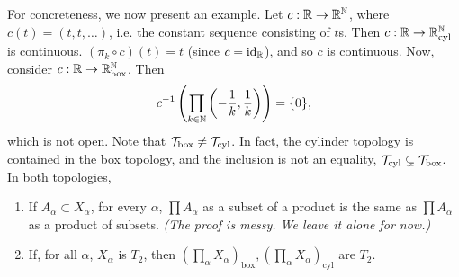 For concreteness, we now present an example. Let $c : \mathbb R \to \mathbb R^\mathbb N$, where $c(t) = (t, t, \dots)$, i.e. the constant sequence consisting of $t$s. Then $c : \mathbb R \to \mathbb R^\mathbb N_\mathrm{cyl}$ is continuous. $(\pi_k \circ c)(t) = t$ (since $c = \mathrm{id}_\mathbb R$), and so $c$ is continuous.
\medskip\newline
Now, consider $c : \mathbb R \to \mathbb R^\mathbb N_\mathrm{box}$. Then
\[c^{-1} \left(\prod_{k \in \mathbb N} \left(-\frac{1}{k}, \frac{1}{k}\right)\right) = \{0\}, \]
which is not open.
\medskip\newline
Note that $\mathcal T_\mathrm{box} \neq \mathcal T_\mathrm{cyl}$. In fact, the cylinder topology is contained in the box topology, and the inclusion is not an equality, $\mathcal T_\mathrm{cyl} \subsetneq \mathcal T_\mathrm{box}$. In both topologies,
\begin{enumerate}[label=(\alph*)]
    \item If $A_\alpha \subset X_\alpha$, for every $\alpha$, $\prod A_\alpha$ as a subset of a product is the same as $\prod A_\alpha$ as a product of subsets. \textit{(The proof is messy. We leave it alone for now.)}
    \item If, for all $\alpha$, $X_\alpha$ is $T_2$, then $(\prod_\alpha X_\alpha)_\mathrm{box}, (\prod_\alpha X_\alpha)_\mathrm{cyl}$ are $T_2$.
\end{enumerate}